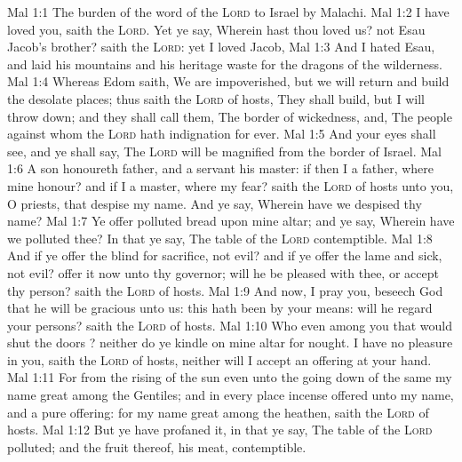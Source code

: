 \vs Mal 1:1 The burden of the word of the \textsc{Lord} to Israel by Malachi.
\vs Mal 1:2 I have loved you, saith the \textsc{Lord}. Yet ye say, Wherein hast thou loved us?  not Esau Jacob's brother? saith the \textsc{Lord}: yet I loved Jacob,
\vs Mal 1:3 And I hated Esau, and laid his mountains and his heritage waste for the dragons of the wilderness.
\vs Mal 1:4 Whereas Edom saith, We are impoverished, but we will return and build the desolate places; thus saith the \textsc{Lord} of hosts, They shall build, but I will throw down; and they shall call them, The border of wickedness, and, The people against whom the \textsc{Lord} hath indignation for ever.
\vs Mal 1:5 And your eyes shall see, and ye shall say, The \textsc{Lord} will be magnified from the border of Israel.
\vs Mal 1:6 A son honoureth  father, and a servant his master: if then I  a father, where  mine honour? and if I  a master, where  my fear? saith the \textsc{Lord} of hosts unto you, O priests, that despise my name. And ye say, Wherein have we despised thy name?
\vs Mal 1:7 Ye offer polluted bread upon mine altar; and ye say, Wherein have we polluted thee? In that ye say, The table of the \textsc{Lord}  contemptible.
\vs Mal 1:8 And if ye offer the blind for sacrifice,  not evil? and if ye offer the lame and sick,  not evil? offer it now unto thy governor; will he be pleased with thee, or accept thy person? saith the \textsc{Lord} of hosts.
\vs Mal 1:9 And now, I pray you, beseech God that he will be gracious unto us: this hath been by your means: will he regard your persons? saith the \textsc{Lord} of hosts.
\vs Mal 1:10 Who  even among you that would shut the doors ? neither do ye kindle  on mine altar for nought. I have no pleasure in you, saith the \textsc{Lord} of hosts, neither will I accept an offering at your hand.
\vs Mal 1:11 For from the rising of the sun even unto the going down of the same my name  great among the Gentiles; and in every place incense  offered unto my name, and a pure offering: for my name  great among the heathen, saith the \textsc{Lord} of hosts.
\vs Mal 1:12 But ye have profaned it, in that ye say, The table of the \textsc{Lord}  polluted; and the fruit thereof,  his meat,  contemptible.
